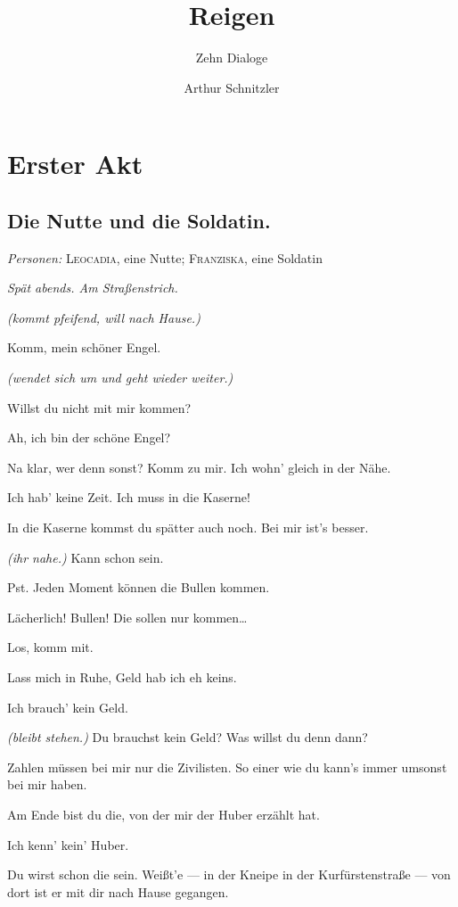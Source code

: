 \documentclass[
	final,
	a4paper,
	ngerman,
	mpinclude = true, %
	twoside = true,
	open = right,
	cleardoublepage = plain,
	DIV = 13,
	BCOR = 1cm,
	titlepage = firstiscover,
	]{scrbook}
\title{Reigen}
\subtitle{Zehn Dialoge}
\author{Arthur Schnitzler}
\date{\ifdirectorsversion{--- Regie-Version ---}{}}
\newcommand{\act}{\chapter}
\newcommand{\scene}{\section}
\newcommand{\direction}[1]{\textit{(#1)}}
\newcommand{\setting}[1]{\vspace{-0.5\baselineskip}\centering\textit{#1}}
\newcommand{\characterlist}[1]{{\begin{center}\textit{Personen:} #1\end{center}}}
\newcommand{\thecharacter}[1]{\textup{\textsc{#1}}\xspace}
\newcommand{\thenutte}{\thecharacter{Leocadia}}
\newcommand{\thesoldatin}{\thecharacter{Franziska}}
\newcommand{\character}[1]{\item[#1:]}
\newcommand{\nutte}{\character{\thenutte}}
\newcommand{\soldatin}{\character{\thesoldatin}}
\begin{document}

\cleardoubleoddemptypage

\maketitle

\tableofcontents
\cleardoubleoddpage

\pagestyle{headings}
\doublespacing

\act{Erster Akt}
\scene{Die Nutte und die Soldatin.}
\characterlist{\thenutte, eine Nutte; \thesoldatin, eine Soldatin}
\setting{Spät abends. Am Straßenstrich.}
\begin{play}
	\soldatin
	\direction{kommt pfeifend, will nach Hause.}

	\nutte
	Komm, mein schöner Engel.

	\soldatin
	\direction{wendet sich um und geht wieder weiter.}

	\nutte
	Willst du nicht mit mir kommen?

	\soldatin
	Ah, ich bin der schöne Engel?

	\nutte
	Na klar, wer denn sonst? Komm zu mir. Ich wohn' gleich in der Nähe.

	\soldatin
	Ich hab' keine Zeit. Ich muss in die Kaserne!

	\nutte
	In die Kaserne kommst du spätter auch noch. Bei mir ist's besser.

	\soldatin
	\direction{ihr nahe.} Kann schon sein.

	\nutte
	Pst. Jeden Moment können die Bullen kommen.

	\soldatin
	Lächerlich! Bullen! Die sollen nur kommen\ldots{}

	\nutte
	Los, komm mit.

	\soldatin
	Lass mich in Ruhe, Geld hab ich eh keins.

	\nutte
	Ich brauch' kein Geld.

	\soldatin
	\direction{bleibt stehen.} Du brauchst kein Geld? Was willst du denn dann?

	\nutte
	Zahlen müssen bei mir nur die Zivilisten. So einer wie du kann's immer umsonst bei mir haben.

	\soldatin
	Am Ende bist du die, von der mir der Huber erzählt hat.

	\nutte
	Ich kenn' kein' Huber.

	\soldatin
	Du wirst schon die sein. Weißt'e --- in der Kneipe in der Kurfürstenstraße --- von dort ist er mit dir nach Hause gegangen.


\end{play}
\end{document}
